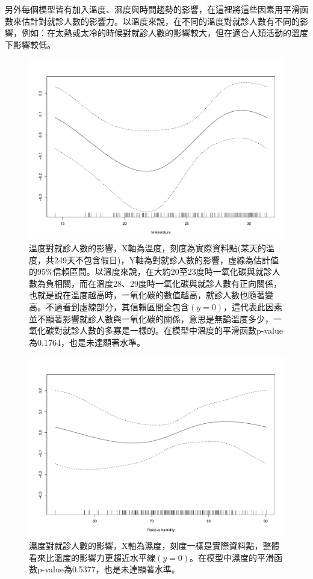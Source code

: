 \documentclass[a4paper, 12pt]{article}
\begin{document}
另外每個模型皆有加入溫度、濕度與時間趨勢的影響，在這裡將這些因素用平滑函數來估計對就診人數的影響力。以溫度來說，在不同的溫度對就診人數有不同的影響，例如：在太熱或太冷的時候對就診人數的影響較大，但在適合人類活動的溫度下影響較低。
\\
\clearpage
\begin{figure}
       \includegraphics[width=13cm]{CO_temp.pdf}
       \caption{\label{}溫度對就診人數的影響，X軸為溫度，刻度為實際資料點(某天的溫度，共249天不包含假日)，Y軸為對就診人數的影響，虛線為估計值的95\%信賴區間。以溫度來說，在大約20至23度時一氧化碳與就診人數為負相關，而在溫度28、29度時一氧化碳與就診人數有正向關係，也就是說在溫度越高時，一氧化碳的數值越高，就診人數也隨著變高。不過看到虛線部分，其信賴區間全包含$(y=0)$，這代表此因素並不顯著影響就診人數與一氧化碳的關係，意思是無論溫度多少，一氧化碳對就診人數的多寡是一樣的。在模型中溫度的平滑函數p-value為0.1764，也是未達顯著水準。}
\end{figure}
\begin{figure}
       \includegraphics[width=13cm]{CO_RH.pdf}
       \caption{\label{}濕度對就診人數的影響，X軸為濕度，刻度一樣是實際資料點，整體看來比溫度的影響力更趨近水平線$(y=0)$。在模型中濕度的平滑函數p-value為0.5377，也是未達顯著水準。}
\end{figure}
\end{document}
